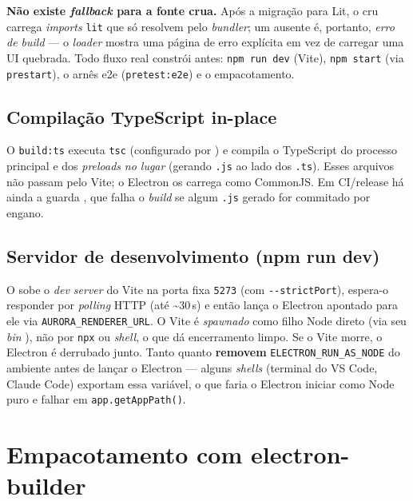 \begin{nota}
\textbf{Não existe \emph{fallback} para a fonte crua.} Após a migração para Lit,
o  cru carrega \emph{imports} \lstinline|lit| que só resolvem
pelo \emph{bundler}; um  ausente é, portanto, \emph{erro de build} ---
o \emph{loader} mostra uma página de erro explícita em vez de carregar uma UI
quebrada. Todo fluxo real constrói  antes: \texttt{npm run dev}
(Vite), \texttt{npm start} (via \texttt{prestart}), o arnês e2e
(\texttt{pretest:e2e}) e o empacotamento.
\end{nota}

\subsection{Compilação TypeScript in-place}
\label{sec:16-tsc}

O \texttt{build:ts} executa \lstinline|tsc| (configurado por )
e compila o TypeScript do processo principal e dos \emph{preloads}
\emph{no lugar} (gerando \texttt{.js} ao lado dos \texttt{.ts}). Esses
arquivos não passam pelo Vite; o Electron os carrega como CommonJS. Em CI/release
há ainda a guarda , que falha o
\emph{build} se algum \texttt{.js} gerado for commitado por engano.

\subsection{Servidor de desenvolvimento (npm run dev)}
\label{sec:16-dev}

O  sobe o \emph{dev server} do Vite na porta fixa
\texttt{5273} (com \lstinline|--strictPort|), espera-o responder por
\emph{polling} HTTP (até \textasciitilde{}30\,s) e então lança o Electron apontado para ele via
\texttt{AURORA\_RENDERER\_URL}. O Vite é \emph{spawnado} como filho Node direto
(via seu \emph{bin} ), não por \texttt{npx}
ou \emph{shell}, o que dá encerramento limpo. Se o Vite morre, o Electron é
derrubado junto. Tanto  quanto 
\textbf{removem} \texttt{ELECTRON\_RUN\_AS\_NODE} do ambiente antes de lançar o
Electron --- alguns \emph{shells} (terminal do VS Code, Claude Code) exportam
essa variável, o que faria o Electron iniciar como Node puro e falhar em
\lstinline|app.getAppPath()|.

\section{Empacotamento com electron-builder}
\label{sec:16-electron-builder}

